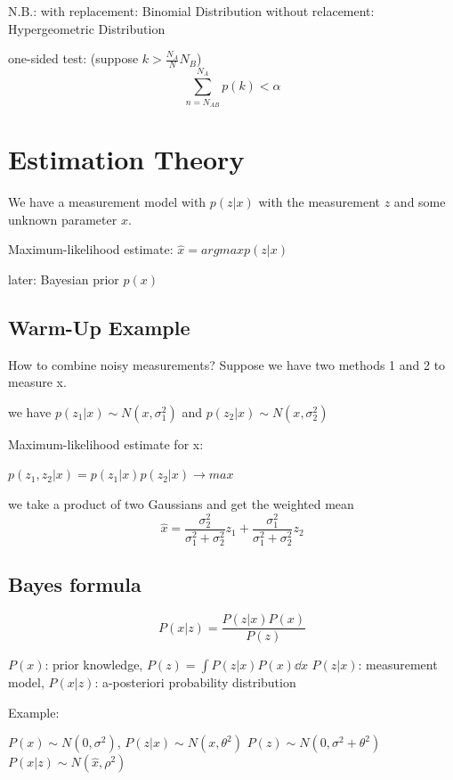 \documentclass{notebook}
\begin{document}
N.B.: with replacement: Binomial Distribution
without relacement: Hypergeometric Distribution

one-sided test: (suppose $k > \frac{N_A}{N}N_B$) 
%
\begin{equation}
	\sum_{n = N_{AB}}^{N_A} p(k) < \alpha
\end{equation}
%

\section{Estimation Theory}

We have a measurement model with $p(z|x)$ with the measurement $z$ and some unknown parameter $x$.

Maximum-likelihood estimate: $\hat{x} = argmax p(z|x)$

later: Bayesian prior $p(x)$

\subsection*{Warm-Up Example}

How to combine noisy measurements? Suppose we have two methods 1 and 2 to measure x.

we have $p(z_1|x) \sim N(x,\sigma_1^2)$ and $p(z_2|x) \sim N(x,\sigma_2^2)$

Maximum-likelihood estimate for x:

$p(z_1,z_2|x) = p(z_1|x)p(z_2|x) \to max$

we take a product of two Gaussians and get the weighted mean
%
\begin{equation}
	\hat{x} = \frac{\sigma_2^2}{\sigma_1^2 + \sigma_2^2} z_1 + \frac{\sigma_1^2}{\sigma_1^2 + \sigma_2^2} z_2
\end{equation}
%

\subsection*{Bayes formula}

%
\begin{equation}
P(x|z) = \frac{P(z|x) P(x)}{P(z)}
\end{equation}
%

$P(x)$: prior knowledge, 
$P(z) = \int P(z|x) P(x) \dd{x} $ 
$P(z|x)$: measurement model,
$P(x|z)$: a-posteriori probability distribution

Example:

$P(x) \sim N(0,\sigma^2)$,
$P(z|x) \sim N(x,\theta^2)$
$P(z) \sim N(0,\sigma^2 + \theta^2)$
$P(x|z) \sim N(\hat{x}, \rho^2)$ 
\end{document}
